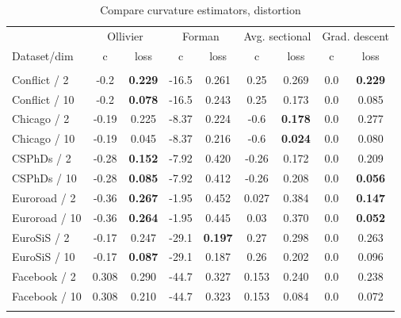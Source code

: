 \documentclass{article} %
\begin{document}
\begin{table}[t]
\caption{Compare curvature estimators, distortion}
\label{tab:compare_distortion}
\begin{center}
\begin{tabular}{lcccccc|cc}
&
\multicolumn{2}{c}{Ollivier} &
\multicolumn{2}{c}{Forman} &
\multicolumn{2}{c}{Avg. sectional} &
\multicolumn{2}{|c}{Grad. descent} \\
Dataset/dim & c & loss  & c & loss  & c & loss  & c & loss \\%
 \hline \\
Conflict / 2 &
-0.2 &	\textbf{0.229} &
-16.5 &	0.261 &
0.25 & 	0.269 &
0.0 & \textbf{0.229} \\
Conflict / 10 &
-0.2 & \textbf{0.078} &
-16.5 &	0.243 &
0.25 &	0.173 &
0.0 & 0.085  \\
Chicago / 2 &
-0.19 & 0.225 & 
-8.37 & 0.224 & 
-0.6 & \textbf{0.178} & 
0.0 & 0.277 \\
Chicago / 10 &
-0.19 & 0.045 & 
-8.37 & 0.216 & 
-0.6 & \textbf{0.024} & 
0.0 & 0.080  \\
CSPhDs / 2 &
-0.28 &	\textbf{0.152} &
-7.92 &	0.420 &
-0.26 & 0.172 &
0.0 & 0.209 \\
CSPhDs / 10 &
-0.28 &	\textbf{0.085} &
-7.92 &	0.412 &
-0.26 & 0.208 &
0.0 & \textbf{0.056} \\
Euroroad / 2 &
-0.36 &	\textbf{0.267} &
-1.95 &	0.452&
0.027 &	0.384&
0.0 & \textbf{0.147}\\
Euroroad / 10 &
-0.36 &	\textbf{0.264} &
-1.95 &	0.445 &
0.03 &	0.370 &
0.0 & \textbf{0.052}  \\
EuroSiS / 2 &
-0.17 & 0.247 & 
-29.1 & \textbf{0.197} & 
0.27 & 0.298 & 
0.0 & 0.263 \\
EuroSiS / 10 &
-0.17 & \textbf{0.087} & 
-29.1 & 0.187 & 
0.26 & 0.202 & 
0.0 & 0.096 \\
Facebook / 2 &
0.308 & 0.290 & 
-44.7 & 0.327 & 
0.153 & 0.240 & 
0.0 & 0.238  \\
Facebook / 10 &
0.308 & 0.210 &
-44.7 & 0.323 & 
0.153 & 0.084 & 
0.0 & 0.072 \\
\hline \\
\end{tabular}
\end{center}
\end{table}
\end{document}
